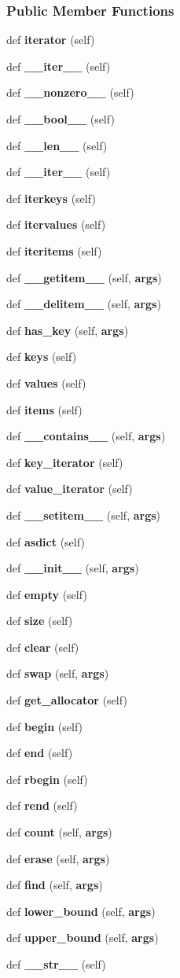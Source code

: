 \subsubsection*{Public Member Functions}
\begin{DoxyCompactItemize}
\item 
def {\bf iterator} (self)
\item 
def {\bf \+\_\+\+\_\+iter\+\_\+\+\_\+} (self)
\item 
def {\bf \+\_\+\+\_\+nonzero\+\_\+\+\_\+} (self)
\item 
def {\bf \+\_\+\+\_\+bool\+\_\+\+\_\+} (self)
\item 
def {\bf \+\_\+\+\_\+len\+\_\+\+\_\+} (self)
\item 
def {\bf \+\_\+\+\_\+iter\+\_\+\+\_\+} (self)
\item 
def {\bf iterkeys} (self)
\item 
def {\bf itervalues} (self)
\item 
def {\bf iteritems} (self)
\item 
def {\bf \+\_\+\+\_\+getitem\+\_\+\+\_\+} (self, {\bf args})
\item 
def {\bf \+\_\+\+\_\+delitem\+\_\+\+\_\+} (self, {\bf args})
\item 
def {\bf has\+\_\+key} (self, {\bf args})
\item 
def {\bf keys} (self)
\item 
def {\bf values} (self)
\item 
def {\bf items} (self)
\item 
def {\bf \+\_\+\+\_\+contains\+\_\+\+\_\+} (self, {\bf args})
\item 
def {\bf key\+\_\+iterator} (self)
\item 
def {\bf value\+\_\+iterator} (self)
\item 
def {\bf \+\_\+\+\_\+setitem\+\_\+\+\_\+} (self, {\bf args})
\item 
def {\bf asdict} (self)
\item 
def {\bf \+\_\+\+\_\+init\+\_\+\+\_\+} (self, {\bf args})
\item 
def {\bf empty} (self)
\item 
def {\bf size} (self)
\item 
def {\bf clear} (self)
\item 
def {\bf swap} (self, {\bf args})
\item 
def {\bf get\+\_\+allocator} (self)
\item 
def {\bf begin} (self)
\item 
def {\bf end} (self)
\item 
def {\bf rbegin} (self)
\item 
def {\bf rend} (self)
\item 
def {\bf count} (self, {\bf args})
\item 
def {\bf erase} (self, {\bf args})
\item 
def {\bf find} (self, {\bf args})
\item 
def {\bf lower\+\_\+bound} (self, {\bf args})
\item 
def {\bf upper\+\_\+bound} (self, {\bf args})
\item 
def {\bf \+\_\+\+\_\+str\+\_\+\+\_\+} (self)
\end{DoxyCompactItemize}
